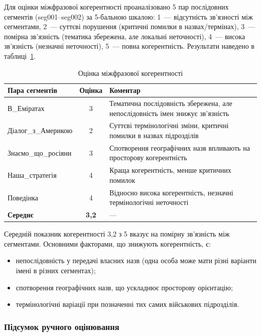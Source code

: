 Для оцінки міжфразової когерентності проаналізовано 5 пар послідовних
сегментів (seg001--seg002) за 5-бальною шкалою: 1~--- відсутність
зв'язності між сегментами, 2~--- суттєві порушення (критичні помилки
в назвах/термінах), 3~--- помірна зв'язність (тематика збережена, але
локальні неточності), 4~--- висока зв'язність (незначні неточності),
5~--- повна когерентність. Результати наведено в таблиці~\ref{tab:coherence}.

\begin{table}[H]
\centering
\caption{Оцінка міжфразової когерентності}
\label{tab:coherence}
\begin{tabular}{|l|c|p{6cm}|}
\hline
\textbf{Пара сегментів} & \textbf{Оцінка} & \textbf{Коментар} \\
\hline
В\_Еміратах & 3 & Тематична послідовність збережена, але непослідовність імен знижує зв'язність \\
\hline
Діалог\_з\_Америкою & 2 & Суттєві термінологічні зміни, критичні помилки в назвах підрозділів \\
\hline
Знаємо\_що\_росіяни & 3 & Спотворення географічних назв впливають на просторову когерентність \\
\hline
Наша\_стратегія & 4 & Краща когерентність, менше критичних помилок \\
\hline
Поведінка & 4 & Відносно висока когерентність, незначні термінологічні неточності \\
\hline
\textbf{Середнє} & \textbf{3,2} & --- \\
\hline
\end{tabular}
\end{table}

Середній показник когерентності 3,2 з 5 вказує на помірну зв'язність між
сегментами. Основними факторами, що знижують когерентність, є:
\begin{itemize}[nosep]
    \item непослідовність у передачі власних назв (одна особа може мати різні
    варіанти імені в різних сегментах);
    \item спотворення географічних назв, що ускладнює просторову орієнтацію;
    \item термінологічні варіації при позначенні тих самих військових підрозділів.
\end{itemize}

\subsubsection{Підсумок ручного оцінювання}

